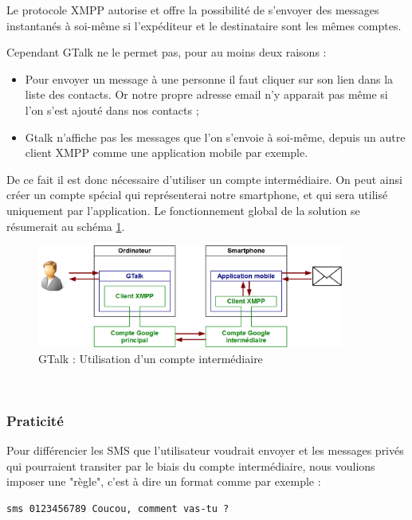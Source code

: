 Le protocole XMPP autorise et offre la possibilité de s'envoyer des messages instantanés à soi-même si l'expéditeur et le destinataire sont les mêmes comptes.

Cependant GTalk ne le permet pas, pour au moins deux raisons :
\begin{itemize}
	\item Pour envoyer un message à une personne il faut cliquer sur son lien dans la liste des contacts.
	Or notre propre adresse email n'y apparait pas même si l'on s'est ajouté dans nos contacts ;
	\item Gtalk n'affiche pas les messages que l'on s'envoie à soi-même, depuis un autre client XMPP comme une application mobile par exemple.
\end{itemize}

De ce fait il est donc nécessaire d'utiliser un compte intermédiaire.
On peut ainsi créer un compte spécial qui représenterai notre smartphone, et qui sera utilisé uniquement par l'application.
Le fonctionnement global de la solution se résumerait au schéma \ref{schemaFonctionnement_GTalk}.

\begin{figure}[!h]
	\center
	\includegraphics[width=0.9\textwidth]{img/schemaFonctionnement_GTalk.png}
	\caption{GTalk : Utilisation d'un compte intermédiaire}
	\label{schemaFonctionnement_GTalk}
\end{figure}
~~\\


\subsubsection{Praticité}

Pour différencier les SMS que l'utilisateur voudrait envoyer et les messages privés qui pourraient transiter par le biais du compte intermédiaire, nous voulions imposer une "règle", c'est à dire un format comme par exemple :
\begin{lstlisting}
sms 0123456789 Coucou, comment vas-tu ?
\end{lstlisting}

